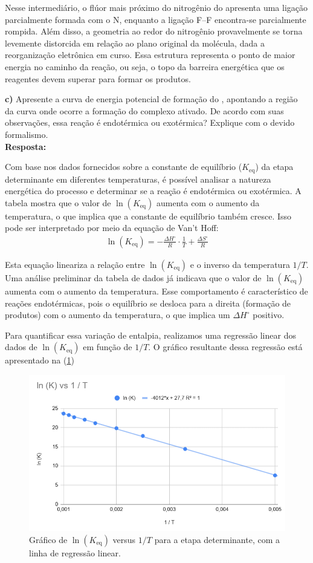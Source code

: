 Nesse intermediário, o flúor mais próximo do nitrogênio do  apresenta uma ligação parcialmente formada com o N, enquanto a ligação F–F encontra-se parcialmente rompida. Além disso, a geometria ao redor do nitrogênio provavelmente se torna levemente distorcida em relação ao plano original da molécula, dada a reorganização eletrônica em curso. Essa estrutura representa o ponto de maior energia no caminho da reação, ou seja, o topo da barreira energética que os reagentes devem superar para formar os produtos.

\vspace{0.4cm}

\textbf{c)} Apresente a curva de energia potencial de formação do , apontando a região da curva onde ocorre a formação do complexo ativado. De acordo com suas observações, essa reação é endotérmica ou exotérmica? Explique com o devido formalismo.\\

\textbf{Resposta:} 

Com base nos dados fornecidos sobre a constante de equilíbrio (\(K_\text{eq}\)) da etapa determinante em diferentes temperaturas, é possível analisar a natureza energética do processo e determinar se a reação é endotérmica ou exotérmica. A tabela mostra que o valor de \(\ln(K_\text{eq})\) aumenta com o aumento da temperatura, o que implica que a constante de equilíbrio também cresce. Isso pode ser interpretado por meio da equação de Van’t Hoff:
\begin{align*}
\ln(K_\text{eq}) = -\frac{\Delta H^\circ}{R} \cdot \frac{1}{T} + \frac{\Delta S^\circ}{R}
\end{align*}

Esta equação lineariza a relação entre \(\ln(K_\text{eq})\) e o inverso da temperatura \(1/T\). Uma análise preliminar da tabela de dados já indicava que o valor de \(\ln(K_\text{eq})\) aumenta com o aumento da temperatura. Esse comportamento é característico de reações endotérmicas, pois o equilíbrio se desloca para a direita (formação de produtos) com o aumento da temperatura, o que implica um \(\Delta H^\circ\) positivo.

Para quantificar essa variação de entalpia, realizamos uma regressão linear dos dados de \(\ln(K_\text{eq})\) em função de \(1/T\). O gráfico resultante dessa regressão está apresentado na (\cref{fig:vant})

\begin{figure}[H]
\centering
\includegraphics[width=0.7\linewidth]{fig/regressao.png}
\caption{Gráfico de \(\ln(K_\text{eq})\) versus \(1/T\) para a etapa determinante, com a linha de regressão linear.}
\label{fig:vant}
\end{figure}

